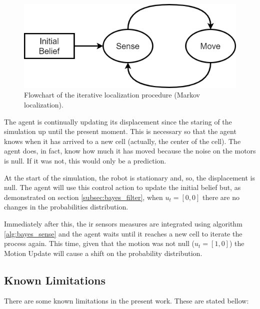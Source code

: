 \documentclass[runningheads]{llncs}
\begin{document}
\begin{figure}
    \centering
    \includegraphics[width=\textwidth]{imgs/flowchart.png}
    \caption{Flowchart of the iterative localization procedure (Markov localization).} 
    \label{fig:markov_flowchart}
\end{figure}
\FloatBarrier

The agent is continually updating its displacement since the staring of the simulation up until the present moment. This is necessary so that the agent knows when it has arrived to a new cell (actually, the center of the cell). The agent does, in fact, know how much it has moved because the noise on the motors is null. If it was not, this would only be a prediction. 

At the start of the simulation, the robot is stationary and, so, the displacement is null. The agent will use this control action to update the initial belief but, as demonstrated on section \ref{subsec:bayes_filter}, when $u_t = [0, 0]$ there are no changes in the probabilities distribution.

Immediately after this, the \gls{ir} sensors measures are integrated using algorithm \ref{alg:bayes_sense} and the agent waits until it reaches a new cell to iterate the process again. This time, given that the motion was not null ($u_t = [1, 0]$) the Motion Update will cause a shift on the probability distribution.

\subsection{Known Limitations}

There are some known limitations in the present work. These are stated bellow:
\end{document}
